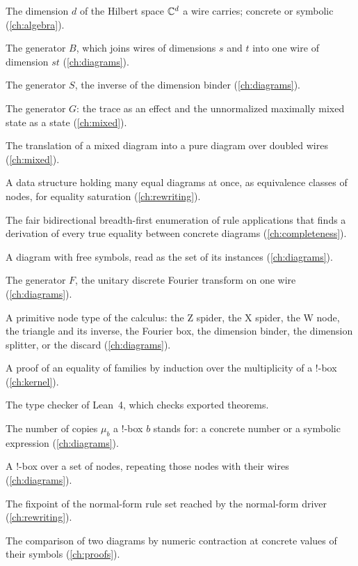\begin{description}[style=nextline,leftmargin=1.5em,font=\normalfont\bfseries]
\item[dimension] The dimension $d$ of the Hilbert space $\mathbb{C}^d$ a wire carries; concrete or symbolic (\cref{ch:algebra}).
\item[dimension binder] The generator $B$, which joins wires of dimensions $s$ and $t$ into one wire of dimension $st$ (\cref{ch:diagrams}).
\item[dimension splitter] The generator $S$, the inverse of the dimension binder (\cref{ch:diagrams}).
\item[discard] The generator $G$: the trace as an effect and the unnormalized maximally mixed state as a state (\cref{ch:mixed}).
\item[doubling] The translation of a mixed diagram into a pure diagram over doubled wires (\cref{ch:mixed}).
\item[e-graph] A data structure holding many equal diagrams at once, as equivalence classes of nodes, for equality saturation (\cref{ch:rewriting}).
\item[exhaustive search] The fair bidirectional breadth-first enumeration of rule applications that finds a derivation of every true equality between concrete diagrams (\cref{ch:completeness}).
\item[family] A diagram with free symbols, read as the set of its instances (\cref{ch:diagrams}).
\item[Fourier box] The generator $F$, the unitary discrete Fourier transform on one wire (\cref{ch:diagrams}).
\item[generator] A primitive node type of the calculus: the Z spider, the X spider, the W node, the triangle and its inverse, the Fourier box, the dimension binder, the dimension splitter, or the discard (\cref{ch:diagrams}).
\item[induction] A proof of an equality of families by induction over the multiplicity of a !-box (\cref{ch:kernel}).
\item[Lean kernel] The type checker of Lean~4, which checks exported theorems.
\item[multiplicity] The number of copies $\mu_b$ a !-box $b$ stands for: a concrete number or a symbolic expression (\cref{ch:diagrams}).
\item[node-scoped !-box] A !-box over a set of nodes, repeating those nodes with their wires (\cref{ch:diagrams}).
\item[normal form] The fixpoint of the normal-form rule set reached by the normal-form driver (\cref{ch:rewriting}).
\item[numeric oracle] The comparison of two diagrams by numeric contraction at concrete values of their symbols (\cref{ch:proofs}).

\end{description}
